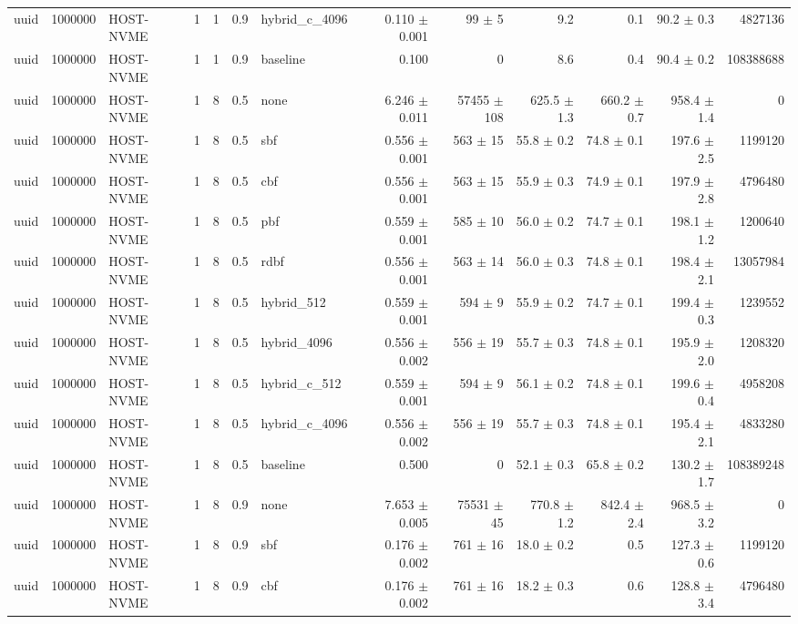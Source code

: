 \begin{tabular}{lllllllrrrrrr}
uuid & 1000000 & HOST-NVME & 1 & 1 & 0.9 & hybrid\_c\_4096 & 0.110 $\pm$ 0.001 & 99 $\pm$ 5 & 9.2 & 0.1 & 90.2 $\pm$ 0.3 & 4827136 \\
uuid & 1000000 & HOST-NVME & 1 & 1 & 0.9 & baseline & 0.100 & 0 & 8.6 & 0.4 & 90.4 $\pm$ 0.2 & 108388688 \\
uuid & 1000000 & HOST-NVME & 1 & 8 & 0.5 & none & 6.246 $\pm$ 0.011 & 57455 $\pm$ 108 & 625.5 $\pm$ 1.3 & 660.2 $\pm$ 0.7 & 958.4 $\pm$ 1.4 & 0 \\
uuid & 1000000 & HOST-NVME & 1 & 8 & 0.5 & sbf & 0.556 $\pm$ 0.001 & 563 $\pm$ 15 & 55.8 $\pm$ 0.2 & 74.8 $\pm$ 0.1 & 197.6 $\pm$ 2.5 & 1199120 \\
uuid & 1000000 & HOST-NVME & 1 & 8 & 0.5 & cbf & 0.556 $\pm$ 0.001 & 563 $\pm$ 15 & 55.9 $\pm$ 0.3 & 74.9 $\pm$ 0.1 & 197.9 $\pm$ 2.8 & 4796480 \\
uuid & 1000000 & HOST-NVME & 1 & 8 & 0.5 & pbf & 0.559 $\pm$ 0.001 & 585 $\pm$ 10 & 56.0 $\pm$ 0.2 & 74.7 $\pm$ 0.1 & 198.1 $\pm$ 1.2 & 1200640 \\
uuid & 1000000 & HOST-NVME & 1 & 8 & 0.5 & rdbf & 0.556 $\pm$ 0.001 & 563 $\pm$ 14 & 56.0 $\pm$ 0.3 & 74.8 $\pm$ 0.1 & 198.4 $\pm$ 2.1 & 13057984 \\
uuid & 1000000 & HOST-NVME & 1 & 8 & 0.5 & hybrid\_512 & 0.559 $\pm$ 0.001 & 594 $\pm$ 9 & 55.9 $\pm$ 0.2 & 74.7 $\pm$ 0.1 & 199.4 $\pm$ 0.3 & 1239552 \\
uuid & 1000000 & HOST-NVME & 1 & 8 & 0.5 & hybrid\_4096 & 0.556 $\pm$ 0.002 & 556 $\pm$ 19 & 55.7 $\pm$ 0.3 & 74.8 $\pm$ 0.1 & 195.9 $\pm$ 2.0 & 1208320 \\
uuid & 1000000 & HOST-NVME & 1 & 8 & 0.5 & hybrid\_c\_512 & 0.559 $\pm$ 0.001 & 594 $\pm$ 9 & 56.1 $\pm$ 0.2 & 74.8 $\pm$ 0.1 & 199.6 $\pm$ 0.4 & 4958208 \\
uuid & 1000000 & HOST-NVME & 1 & 8 & 0.5 & hybrid\_c\_4096 & 0.556 $\pm$ 0.002 & 556 $\pm$ 19 & 55.7 $\pm$ 0.3 & 74.8 $\pm$ 0.1 & 195.4 $\pm$ 2.1 & 4833280 \\
uuid & 1000000 & HOST-NVME & 1 & 8 & 0.5 & baseline & 0.500 & 0 & 52.1 $\pm$ 0.3 & 65.8 $\pm$ 0.2 & 130.2 $\pm$ 1.7 & 108389248 \\
uuid & 1000000 & HOST-NVME & 1 & 8 & 0.9 & none & 7.653 $\pm$ 0.005 & 75531 $\pm$ 45 & 770.8 $\pm$ 1.2 & 842.4 $\pm$ 2.4 & 968.5 $\pm$ 3.2 & 0 \\
uuid & 1000000 & HOST-NVME & 1 & 8 & 0.9 & sbf & 0.176 $\pm$ 0.002 & 761 $\pm$ 16 & 18.0 $\pm$ 0.2 & 0.5 & 127.3 $\pm$ 0.6 & 1199120 \\
uuid & 1000000 & HOST-NVME & 1 & 8 & 0.9 & cbf & 0.176 $\pm$ 0.002 & 761 $\pm$ 16 & 18.2 $\pm$ 0.3 & 0.6 & 128.8 $\pm$ 3.4 & 4796480 \\

\end{tabular}

